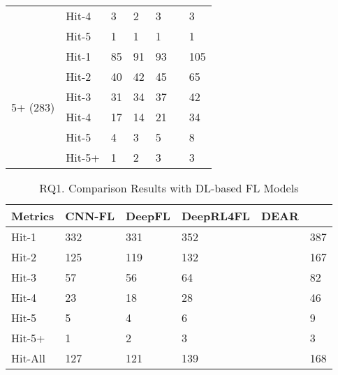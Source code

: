 \begin{table}[t]
{\begin{center}
\begin{tabular}{p{1.3cm}<{\centering}|p{0.8cm}<{\centering}|p{1cm}<{\centering}|p{0.8cm}<{\centering}|p{1.3cm}<{\centering}|p{1cm}<{\centering}|p{1.3cm}<{\centering}}
				& Hit-4     & 3 & 2 & 3 & & 3 \\
				& Hit-5     & 1 & 1 & 1 & & 1 \\
				\hline
				\multirow{6}{*}{5+ (283)}  & Hit-1 & 85 & 91 & 93 & & 105 \\
				& Hit-2     & 40 & 42 & 45 & & 65 \\
				& Hit-3     & 31 & 34 & 37 & & 42 \\
				& Hit-4     & 17 & 14 & 21 & & 34 \\
				& Hit-5     & 4 & 3 & 5 & & 8 \\
				& Hit-5+    & 1 & 2 & 3 & & 3 \\
				\hline
			\end{tabular}
			
			\label{fig:rq1-details}
		\end{center}
	}
\end{table}

\begin{table}[t]
	\caption{RQ1. Comparison Results with DL-based FL Models}
	\vspace{-10pt}
	{\small
		\begin{center}
			\renewcommand{\arraystretch}{1}
			\begin{tabular}{p{1.2cm}<{\centering}|p{1cm}<{\centering}|p{0.8cm}<{\centering}|p{1.2cm}<{\centering}|p{1cm}<{\centering}|p{1.2cm}<{\centering}}
				\hline
				Metrics & CNN-FL & DeepFL & DeepRL4FL & DEAR & \tool \\			
				\hline
				Hit-1   & 332 & 331 & 352 & & 387 \\
				Hit-2	& 125 & 119 & 132 & & 167 \\
				Hit-3	& 57 & 56 & 64 & & 82 \\
				Hit-4	& 23 & 18 & 28 & & 46 \\
				Hit-5	& 5 & 4 & 6 & & 9 \\
				Hit-5+	& 1 & 2 & 3 & & 3 \\
                                Hit-All & 127  & 121  & 139  & & 168\\
				\hline
			\end{tabular}
			
			\label{fig:rq1-overview}
		\end{center}
	}
\end{table}

